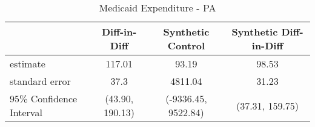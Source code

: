\begin{table}[ht]
\centering
\begin{tabular}{lccc}
  \hline
 & Diff-in-Diff & Synthetic Control & Synthetic Diff-in-Diff \\ 
  \hline
estimate & 117.01 & 93.19 & 98.53 \\ 
  standard error & 37.3 & 4811.04 & 31.23 \\ 
  95\% Confidence Interval & (43.90, 190.13) & (-9336.45, 9522.84) & (37.31, 159.75) \\ 
   \hline
\end{tabular}
\caption{Medicaid Expenditure - PA} 
\end{table}

